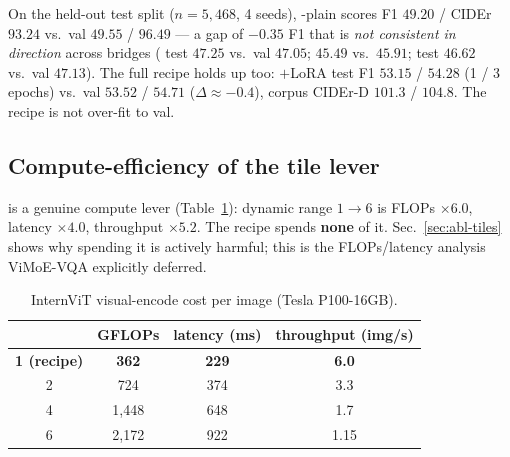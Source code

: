 On the held-out test split ($n = 5{,}468$, 4 seeds), \multitoken{}-plain scores
F1 $49.20$ / CIDEr $93.24$ vs.\ val $49.55$ / $96.49$ --- a gap of $-0.35$ F1 that
is \emph{not consistent in direction} across bridges ( test
$47.25$ vs.\ val $47.05$;  $45.49$ vs.\ $45.91$;
 test $46.62$ vs.\ val $47.13$). The full recipe holds up too:
$+$LoRA test F1 $53.15$ / $54.28$ (1 / 3 epochs) vs.\ val $53.52$ / $54.71$
($\Delta \approx -0.4$), corpus CIDEr-D $101.3$ / $104.8$. The recipe is not
over-fit to val.

\subsection{Compute-efficiency of the tile lever}
\label{sec:abl-compute}

\ntiles{} is a genuine compute lever (Table~\ref{tab:compute}): dynamic range
$1{\rightarrow}6$ is FLOPs $\times 6.0$, latency $\times 4.0$, throughput
$\times 5.2$. The recipe spends \textbf{none} of it. Sec.~\ref{sec:abl-tiles}
shows why spending it is actively harmful; this is the FLOPs/latency analysis
ViMoE-VQA explicitly deferred.

\begin{table}[t]
  \centering
  \caption{InternViT visual-encode cost per image (Tesla P100-16GB).}
  \label{tab:compute}
  \begin{tabular}{cccc}
    \toprule
    \ntiles{} & GFLOPs & latency (ms) & throughput (img/s) \\
    \midrule
    \textbf{1 (recipe)} & \textbf{362} & \textbf{229} & \textbf{6.0} \\
    2 & 724     & 374 & 3.3 \\
    4 & 1{,}448 & 648 & 1.7 \\
    6 & 2{,}172 & 922 & 1.15 \\
    \bottomrule
  \end{tabular}
\end{table}
